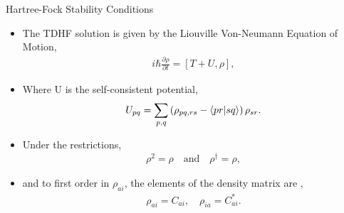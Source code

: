 \documentclass[10pt]{beamer}
\begin{document}
{{{{%
\begin{frame}{Hartree-Fock Stability Conditions}
	\begin{itemize}[<+->]
		\item[]{The TDHF solution is given by the Liouville Von-Neumann Equation of Motion,
			\begin{eqnarray}
				i\hbar\frac{\partial \rho}{\partial t} = \left[ T+U, \rho \right],
			\end{eqnarray}
		}
		\item[]{Where U is the self-consistent potential,
			\begin{eqnarray}
				U_{pq} = \sum\limits_{p,q} \left(\rho_{pq,rs} - \braket{pr|sq} \right) \rho_{sr}.
			\end{eqnarray}
		}
		\item[]{Under the restrictions,
			\begin{eqnarray}
				\rho^2 = \rho \quad \textrm{and} \quad \rho^{\dagger} = \rho,
			\end{eqnarray}
		}
		\item[]{and to first order in $\rho_{ai}$, the elements of the density matrix are ,
			\begin{eqnarray}
				\rho_{ai} = C_{ai}, \quad \rho_{ia} = C_{ai}^*.
			\end{eqnarray}
		}
	\end{itemize}
\end{frame}

{%

}}}}}
\end{document}
